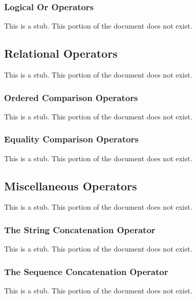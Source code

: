 \subsubsection{Logical Or Operators}
\label{Logical_Or_Operators}

This is a stub.  This portion of the document does not exist.

\subsection{Relational Operators}
\label{Relational_Operators}

This is a stub.  This portion of the document does not exist.

\subsubsection{Ordered Comparison Operators}
\label{Ordered_Comparison_Operators}

This is a stub.  This portion of the document does not exist.

\subsubsection{Equality Comparison Operators}
\label{Equality_Comparison_Operators}

This is a stub.  This portion of the document does not exist.

\subsection{Miscellaneous Operators}
\label{Miscellaneous_Operators}

This is a stub.  This portion of the document does not exist.

\subsubsection{The String Concatenation Operator}
\label{The_String_Concatenation_Operator}

This is a stub.  This portion of the document does not exist.

\subsubsection{The Sequence Concatenation Operator}
\label{The_Sequence_Concatenation_Operator}

This is a stub.  This portion of the document does not exist.

